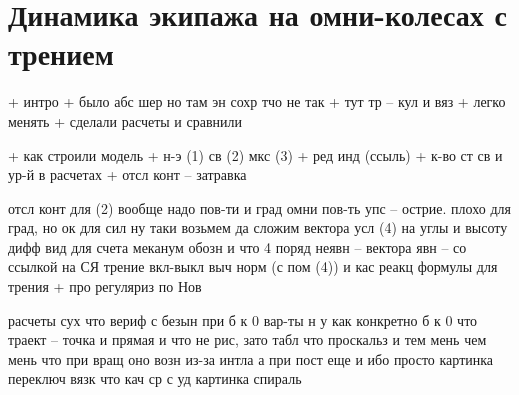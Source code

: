 \chapter{Динамика экипажа на омни-колесах с трением}

+ интро
    + было абс шер но там эн сохр тчо не так
    + тут тр -- кул и вяз
    + легко менять
    + сделали расчеты и сравнили

+ как строили модель
    + н-э (1) св (2) мкс (3)
    + ред инд (ссыль)
    + к-во ст св и ур-й в расчетах
    + отсл конт -- затравка

отсл конт
    для (2) вообще надо пов-ти и град
    омни
        пов-ть
        упс -- острие. плохо для град, но ок для сил 
        ну таки возьмем да сложим вектора
        усл (4) на углы и высоту
        дифф вид для счета
    меканум
        обозн и что 4 поряд
        неявн -- вектора
        явн -- со ссылкой на СЯ
    трение
        вкл-выкл
        выч норм (с пом (4)) и кас реакц
        формулы для трения + про регуляриз по Нов
        
расчеты
    сух
        что вериф с безын при б к 0
        вар-ты н у
        как конкретно б к 0
        что траект -- точка и прямая и что не рис, зато табл
        что проскальз и тем мень чем мень
        что при вращ оно возн из-за интла а при пост еще и ибо просто
        картинка переключ
    вязк
        что кач ср с уд
        картинка спираль
    